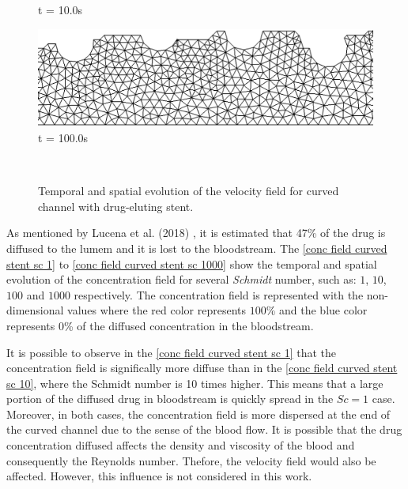 \begin{figure}[H]
\begin{minipage}{.50\linewidth}
      t = 10.0s
     \end{minipage}%
     \begin{minipage}{.50\linewidth}
     \medskip
      \centering
      \includegraphics[scale=0.2]{./02_chaps/cap_solution/figure/alereal4.png}\\
      t = 100.0s
     \end{minipage}\\[10pt]
     \medskip
     \caption{
Temporal and spatial evolution of the velocity field for curved channel with
drug-eluting stent.}
     \label{velocity field curved stent}
\end{figure}


\vspace{1cm}
As mentioned by Lucena et al. (2018) \cite{lucena2018}, 
it is estimated that 47\% of the drug is diffused to the 
lumem and it is lost to the bloodstream.
The \ref{conc field curved stent sc 1} to 
\ref{conc field curved stent sc 1000} show the temporal and spatial evolution 
of the concentration field for several \textit{Schmidt} number, 
such as: $1$, $10$, $100$ and $1000$ respectively. The concentration field is 
represented with the non-dimensional values where the red color 
represents $100$\% and the blue color represents $0$\% 
of the diffused concentration in the bloodstream. 

\medskip
It is possible to observe in the \ref{conc field curved stent sc 1}
that the concentration field is significally more diffuse than in the
\ref{conc field curved stent sc 10}, where the Schmidt number
is 10 times higher. This means that a large portion of the
diffused drug in bloodstream is quickly spread in the
$Sc=1$ case.
Moreover, in both cases, the concentration field
is more dispersed at the end of the curved channel due to
the sense of the blood flow. It is possible that the
drug concentration diffused affects the density and viscosity of the blood
and consequently the Reynolds number. Thefore, the velocity field would
also be affected. However, this influence is not considered in this work.



